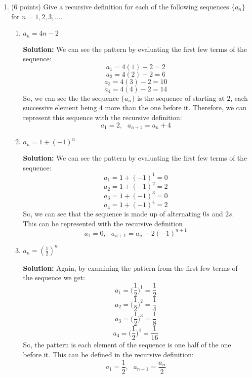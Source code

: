 \documentclass[11pt]{article}
\begin{document}
\begin{enumerate}
\begin{proof}
Therefore, we have proven that if $n_1 = n_2 > 1$, there is a winning strategy for the second player.  

Also, if $n_1 \not = n_2$ there is not any guaranteed strategy for a player 2 to win.  Consider the game where there is a row of $3$ dots and a row of $2$ dots.  Then for the case where player 1 removes one dots from the row of three dots, either way the second player will lose (depending of course on the intelligence of the first player).  
\end{proof}
\item (6 points) Give a recursive definition for each of the following sequences
$\{a_n\}$ for $n=1, 2, 3, \ldots$.

\begin{enumerate}
\item $a_n=4n-2$

\textbf{Solution: }
We can see the pattern by evaluating the first few terms of the sequence:
$$ a_1 = 4(1) - 2 = 2 $$
$$ a_2 = 4(2) - 2 = 6 $$
$$ a_3 = 4(3) - 2 = 10 $$
$$ a_4 = 4(4) - 2 = 14 $$
So, we can see the the sequence $\{a_n\}$ is the sequence of starting at $2$, each successive element being $4$ more than the one before it.  Therefore, we can represent this sequence with the recursive definition:
$$ a_1 = 2,\text{ } a_{n+1} = a_n + 4 $$

\item $a_n=1+(-1)^n$

\textbf{Solution: }
We can see the pattern by evaluating the first few terms of the sequence:
$$ a_1 = 1 + (-1)^1 = 0 $$
$$ a_2 = 1 + (-1)^2 = 2 $$
$$ a_3 = 1 + (-1)^3 = 0 $$
$$ a_4 = 1 + (-1)^4 = 2 $$
So, we can see that the sequence is made up of alternating $0s$ and $2s$.  This can be represented with the recursive definition
$$ a_1 = 0,\text{ } a_{n+1} = a_n + 2(-1)^{n+1} $$

\item $a_n=(\frac{1}{2})^n$

\textbf{Solution: }
Again, by examining the pattern from the first few terms of the sequence we get:
$$ a_1 = \bigg(\frac{1}{2}\bigg)^1 = \frac{1}{2} $$
$$ a_2 = \bigg(\frac{1}{2}\bigg)^2 = \frac{1}{4} $$
$$ a_3 = \bigg(\frac{1}{2}\bigg)^3 = \frac{1}{8} $$
$$ a_4 = \bigg(\frac{1}{2}\bigg)^4 = \frac{1}{16} $$
So, the pattern is each element of the sequence is one half of the one before it.  This can be defined in the recursive definition:
$$ a_1 = \frac{1}{2},\text{ } a_{n+1} = \dfrac{a_n}{2} $$

\end{enumerate} 


\end{enumerate}
\end{document}
